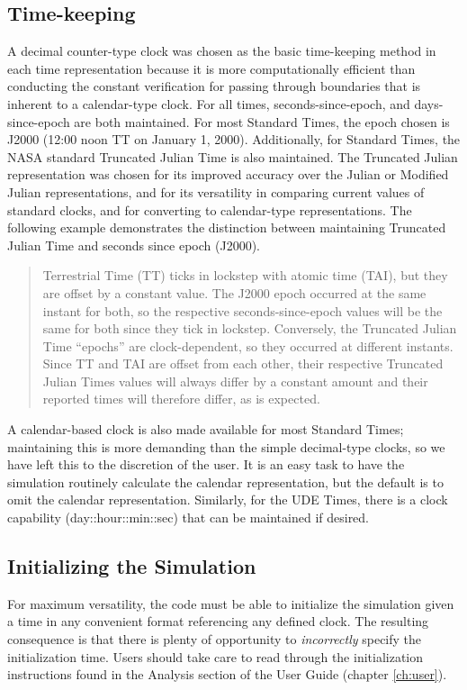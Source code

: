 \subsection[\ Time{}-keeping]{ Time-keeping}
A decimal counter-type clock was chosen as the basic time-keeping method
in each time representation because it is more computationally
efficient than conducting the constant verification for passing through
boundaries that is inherent to a calendar-type clock.  For all times,
seconds-since-epoch, and days-since-epoch are both maintained.  For
most Standard Times, the epoch chosen is J2000 (12:00 noon TT on
January 1, 2000).  Additionally, for Standard Times, the NASA standard
Truncated Julian Time is also maintained.  The Truncated Julian
representation was chosen for its improved accuracy over the Julian or
Modified Julian representations, and for its versatility in comparing
current values of standard clocks, and for converting to calendar-type
representations.  The following example demonstrates the distinction
between maintaining Truncated Julian Time and seconds since epoch
(J2000).

\begin{quotation}
Terrestrial Time (TT) ticks in lockstep with atomic time (TAI), but they
are offset by a constant value.  The J2000 epoch occurred at the same
instant for both, so the respective seconds-since-epoch values will be
the same for both since they tick in lockstep.  Conversely, the
Truncated Julian Time {\textquotedblleft}epochs{\textquotedblright} are
clock-dependent, so they occurred at different instants.  Since TT and
TAI are offset from each other, their respective Truncated Julian Times
values will always differ by a constant amount and their reported times
will therefore differ, as is expected.
\end{quotation}

A calendar-based clock is also made available for most Standard Times;
maintaining this is more demanding than the simple decimal-type clocks,
so we have left this to the discretion of the user.  It is an easy task
to have the simulation routinely calculate the calendar representation,
but the default is to omit the calendar representation.  Similarly, for
the UDE Times, there is a clock capability (day::hour::min::sec) that
can be maintained if desired.




\subsection{Initializing the Simulation}
For maximum versatility, the code must be able to initialize the
simulation given a time in any convenient format referencing any
defined clock.  The resulting consequence is that there is plenty of
opportunity to \textit{incorrectly } specify the initialization time. 
Users should take care to read through the initialization instructions
found in the Analysis section of the User Guide (chapter \ref{ch:user}).




